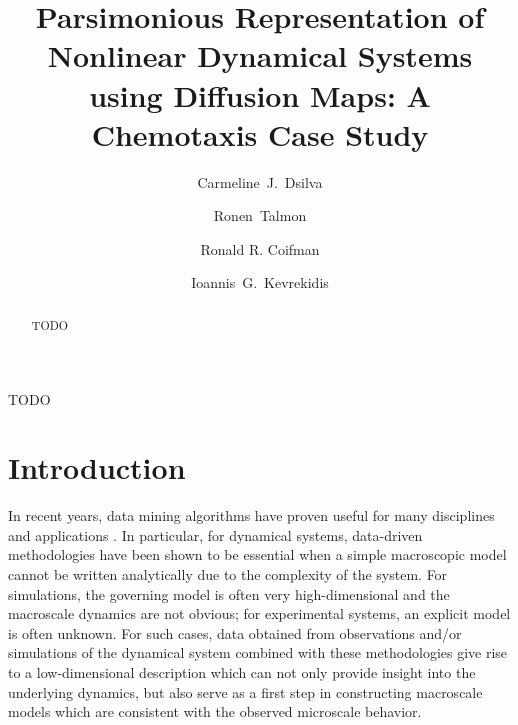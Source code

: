 \documentclass[preprint]{elsarticle}
\begin{document}
\begin{frontmatter}

\title{Parsimonious Representation of Nonlinear Dynamical Systems using Diffusion Maps: A Chemotaxis Case Study}

\author[princeton]{Carmeline~J.~Dsilva}
%
\author[technion]{Ronen~Talmon}
%
\author[yale]{Ronald R. Coifman}
%
\author[princeton, princetonpacm]{Ioannis~G.~Kevrekidis }
%
\address[princeton]{Department of Chemical and Biological Engineering, Princeton University, Princeton, NJ, 08540, USA}
\address[technion]{Technion - Israel Institute of Technology, Haifa, 3200003, Israel}
\address[yale]{Department of Mathematics, Yale University, New Haven, CT, 06520, USA}
\address[princetonpacm]{Program in Applied and Computational Mathematics, Princeton University, Princeton, NJ, 08540, USA}
%


\begin{abstract}

TODO
\end{abstract}


\begin{keyword}
TODO
\end{keyword}

\end{frontmatter}


\section{Introduction}

In recent years, data mining algorithms have proven useful for many disciplines and applications \cite{....}. 
%
In particular, for dynamical systems, data-driven methodologies have been shown to be essential when a simple macroscopic model cannot be written analytically due to the complexity of the system.
%
For simulations, the governing model is often very high-dimensional and the macroscale dynamics are not obvious; for experimental systems, an explicit model is often unknown. 
%
For such cases, data obtained from observations and/or simulations of the dynamical system combined with these methodologies give rise to a low-dimensional description which can not only provide insight into the underlying dynamics, but also serve as a first step in constructing macroscale models which are consistent with the observed microscale behavior. 
\end{document}
